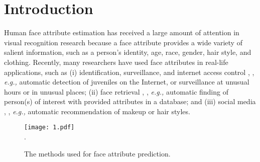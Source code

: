 \documentclass{sig-alternate-05-2015}
\begin{document}
\printccsdesc








\section{Introduction}
Human face attribute estimation has received a large amount of attention in visual recognition research because a face attribute provides a wide variety of salient information, such as a person's identity, age, race, gender, hair style, and clothing. Recently, many researchers have used face attributes in real-life applications, such as (i) identification, surveillance, and internet access control \cite{Fu2010Age}, \cite{Liu2015Age}, {\em e.g.,} automatic detection of juveniles on the Internet, or surveillance at unusual hours or in unusual places; (ii) face retrieval \cite{DBLP:journals/corr/RanjanPC16}, \cite{5871641}, {\em e.g.,} automatic finding of person(s) of interest with provided attributes in a database; and (iii) social media \cite{6035718}, \cite{Qi2009Learning}, {\em e.g.,} automatic recommendation of makeup or hair styles.


\begin{figure}[t]
\centering
\setlength{\fboxsep}{0pt}
\setlength{\fboxrule}{0pt}
\texttt{[image: 1.pdf]} \\
\DeclareGraphicsExtensions.
\caption{The methods used for face attribute prediction. }
\label{fig:1}
\end{figure}
\end{document}
